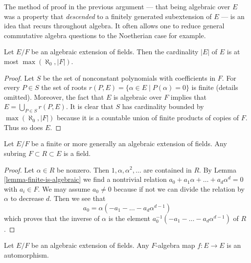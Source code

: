 \noindent
The method of proof in the previous argument --- that being algebraic
over $E$ was a property that {\it descended} to a finitely generated
subextension of $E$ --- is an idea that recurs throughout algebra.
It often allows one to reduce general commutative algebra questions
to the Noetherian case for example.

\begin{lemma}
\label{lemma-size-algebraic-extension}
Let $E/F$ be an algebraic extension of fields. Then the cardinality $|E|$
of $E$ is at most $\max(\aleph_0, |F|)$.
\end{lemma}

\begin{proof}
Let $S$ be the set of nonconstant polynomials with coefficients in $F$.
For every $P \in S$ the set of roots
$r(P, E) = \{\alpha \in E \mid P(\alpha) = 0\}$
is finite (details omitted). Moreover, the fact that $E$ is algebraic
over $F$ implies that $E = \bigcup_{P \in S} r(P, E)$.
It is clear that $S$ has cardinality bounded by $\max(\aleph_0, |F|)$
because it is a countable union of finite products of copies of $F$.
Thus so does $E$.
\end{proof}

\begin{lemma}
\label{lemma-subalgebra-algebraic-extension-field}
Let $E/F$ be a finite or more generally an algebraic extension of fields.
Any subring $F \subset R \subset E$ is a field.
\end{lemma}

\begin{proof}
Let $\alpha \in R$ be nonzero. Then $1, \alpha, \alpha^2, \ldots$
are contained in $R$. By Lemma \ref{lemma-finite-is-algebraic}
we find a nontrivial relation
$a_0 + a_1 \alpha + \ldots + a_d \alpha^d = 0$ with $a_i \in F$.
We may assume $a_0 \not = 0$ because if not we can divide the relation
by $\alpha$ to decrease $d$. Then we see that
$$
a_0 = \alpha (- a_1  - \ldots - a_d \alpha^{d - 1})
$$
which proves that the inverse of $\alpha$ is the element
$a_0^{-1} (- a_1  - \ldots - a_d \alpha^{d - 1})$
of $R$.
\end{proof}

\begin{lemma}
\label{lemma-algebraic-extension-self-map}
Let $E/F$ be an algebraic extension of fields. Any $F$-algebra map
$f : E \to E$ is an automorphism.
\end{lemma}

